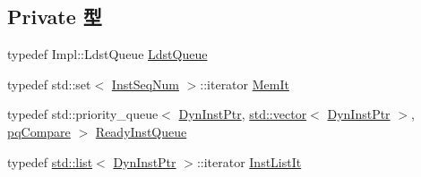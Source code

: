 \subsection*{Private 型}
\begin{DoxyCompactItemize}
\item 
typedef Impl::LdstQueue \hyperlink{classLWBackEnd_a4c90230ea80fdcedea6e4fb9b43009cd}{LdstQueue}
\item 
typedef std::set$<$ \hyperlink{inst__seq_8hh_a258d93d98edaedee089435c19ea2ea2e}{InstSeqNum} $>$::iterator \hyperlink{classLWBackEnd_a3beb474846c53de6d7b8047314dcf3cd}{MemIt}
\item 
typedef std::priority\_\-queue$<$ \hyperlink{classLWBackEnd_a028ce10889c5f6450239d9e9a7347976}{DynInstPtr}, \hyperlink{classstd_1_1vector}{std::vector}$<$ \hyperlink{classLWBackEnd_a028ce10889c5f6450239d9e9a7347976}{DynInstPtr} $>$, \hyperlink{structLWBackEnd_1_1pqCompare}{pqCompare} $>$ \hyperlink{classLWBackEnd_a60636ae8f3b649078c4f1bdd3b20dcad}{ReadyInstQueue}
\item 
typedef \hyperlink{classstd_1_1list}{std::list}$<$ \hyperlink{classLWBackEnd_a028ce10889c5f6450239d9e9a7347976}{DynInstPtr} $>$::iterator \hyperlink{classLWBackEnd_a4da46d72d68fcd5bfe65dc701c358379}{InstListIt}
\end{DoxyCompactItemize}

